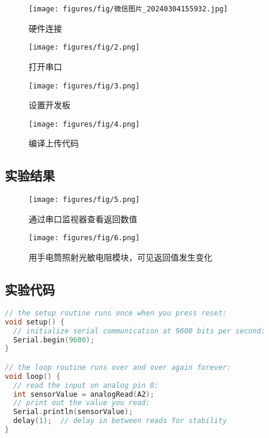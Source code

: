 \documentclass[12pt,hyperref,a4paper,UTF8]{ctexart}
\begin{document}
    \begin{figure}[H]
        \centering
        \texttt{[image: figures/fig/微信图片\_20240304155932.jpg]}
        \caption{硬件连接}
        \label{fig:enter-label}
    \end{figure}

    \begin{figure}
        \centering
        \texttt{[image: figures/fig/2.png]}
        \caption{打开串口}
        \label{fig:enter-label}
    \end{figure}

    \begin{figure}
        \centering
        \texttt{[image: figures/fig/3.png]}
        \caption{设置开发板}
        \label{fig:enter-label}
    \end{figure}

    \begin{figure}
        \centering
        \texttt{[image: figures/fig/4.png]}
        \caption{编译上传代码}
        \label{fig:enter-label}
    \end{figure}
\subsection{实验结果}

    \begin{figure}[H]
        \centering
        \texttt{[image: figures/fig/5.png]}
        \caption{通过串口监视器查看返回数值}
        \label{fig:enter-label}
    \end{figure}

    \begin{figure}[H]
        \centering
        \texttt{[image: figures/fig/6.png]}
        \caption{用手电筒照射光敏电阻模块，可见返回值发生变化}
        \label{fig:enter-label}
    \end{figure}


\subsection{实验代码}

\begin{lstlisting}[language=C]
// the setup routine runs once when you press reset:
void setup() {
  // initialize serial communication at 9600 bits per second:
  Serial.begin(9600);
}

// the loop routine runs over and over again forever:
void loop() {
  // read the input on analog pin 0:
  int sensorValue = analogRead(A2);
  // print out the value you read:
  Serial.println(sensorValue);
  delay(1);  // delay in between reads for stability
}

\end{lstlisting}
\end{document}
